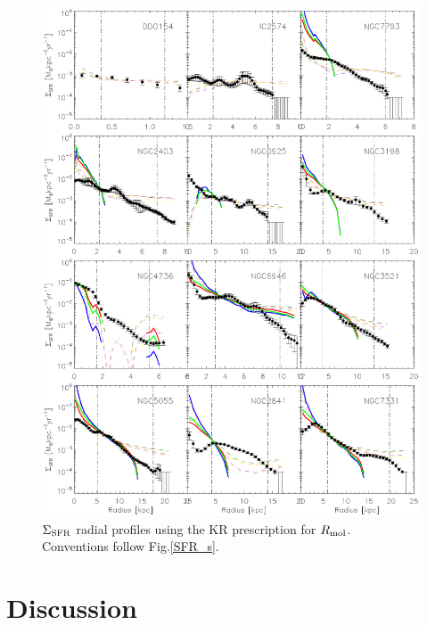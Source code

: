 \documentclass[12pt,preprint]{aastex}
\begin{document}
\begin{figure}
\begin{center}
\includegraphics[scale=0.8]{SFR_k.eps}  \caption{$\Sigma_{\rm SFR}$ radial profiles using the KR prescription for $R_{\rm mol}$. Conventions follow Fig.\ref{SFR_s}.}
\label{SFR_k}
\end{center}
\end{figure}












\section{Discussion}
\label{discussion}
\end{document}
